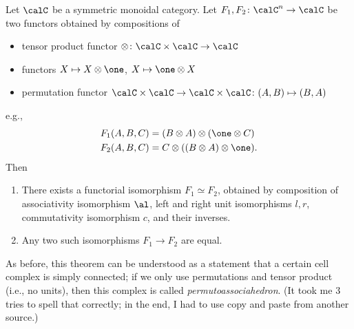 \begin{theorem}\label{t:maclane-symmetric}\par

  \noindent
  Let $\calC$ be a symmetric monoidal category. Let $F_1, F_2\colon \calC^n\to
  \calC$ be two functors obtained by compositions of
  \begin{itemize}
    \item tensor product functor $\otimes\colon \calC\times \calC\to \calC$
    \item functors $X\mapsto X\otimes \one$, $X\mapsto \one \otimes X$
    \item permutation functor $\calC\times \calC \to \calC\times \calC
          \colon (A, B)\mapsto (B,A)$
  \end{itemize}
  e.g.,
  \begin{align*}
    F_1(A,B,C)&=(B\otimes A)\otimes (\one\otimes C)\\
    F_2(A,B,C)&=C\otimes ((B\otimes  A)\otimes \one).
  \end{align*}
  Then
  \begin{enumerate}
    \item There exists a functorial isomorphism $F_1\simeq F_2$, obtained
      by composition of associativity isomorphism $\al$, left and right
      unit isomorphisms $l,r$, commutativity isomorphism $c$, and their
      inverses.
    \item Any two such isomorphisms $F_1\to F_2$ are equal.
  \end{enumerate}
\end{theorem}
As before, this theorem can be understood as a statement that a certain cell
complex is simply connected; if we only use permutations and tensor product
(i.e., no units), then this complex is called \emph{permutoassociahedron}. (It
took me 3 tries to spell that correctly; in the end, I had to use copy and
paste from another source.)

\clearpage
